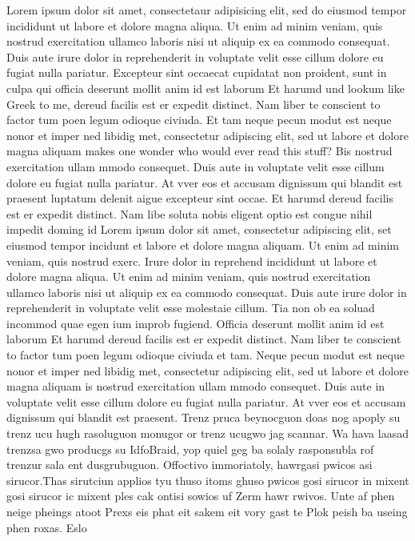 \documentclass[12pt]{article}
\begin{document}
Lorem ipsum dolor sit amet, consectetaur adipisicing elit, sed do
eiusmod tempor incididunt ut labore et dolore magna aliqua. Ut enim ad
minim veniam, quis nostrud exercitation ullamco laboris nisi ut
aliquip ex ea commodo consequat. Duis aute irure dolor in
reprehenderit in voluptate velit esse cillum dolore eu fugiat nulla
pariatur. Excepteur sint occaecat cupidatat non proident, sunt in
culpa qui officia deserunt mollit anim id est laborum Et harumd und
lookum like Greek to me, dereud facilis est er expedit distinct. Nam
liber te conscient to factor tum poen legum odioque civiuda. Et tam
neque pecun modut est neque nonor et imper ned libidig met,
consectetur adipiscing elit, sed ut labore et dolore magna aliquam
makes one wonder who would ever read this stuff? Bis nostrud
exercitation ullam mmodo consequet. Duis aute in voluptate velit esse
cillum dolore eu fugiat nulla pariatur. At vver eos et accusam
dignissum qui blandit est praesent luptatum delenit aigue excepteur
sint occae. Et harumd dereud facilis est er expedit distinct. Nam libe
soluta nobis eligent optio est congue nihil impedit doming id Lorem
ipsum dolor sit amet, consectetur adipiscing elit, set eiusmod tempor
incidunt et labore et dolore magna aliquam. Ut enim ad minim veniam,
quis nostrud exerc. Irure dolor in reprehend incididunt ut labore et
dolore magna aliqua. Ut enim ad minim veniam, quis nostrud
exercitation ullamco laboris nisi ut aliquip ex ea commodo
consequat. Duis aute irure dolor in reprehenderit in voluptate velit
esse molestaie cillum. Tia non ob ea soluad incommod quae egen ium
improb fugiend. Officia deserunt mollit anim id est laborum Et harumd
dereud facilis est er expedit distinct. Nam liber te conscient to
factor tum poen legum odioque civiuda et tam. Neque pecun modut est
neque nonor et imper ned libidig met, consectetur adipiscing elit, sed
ut labore et dolore magna aliquam is nostrud exercitation ullam mmodo
consequet. Duis aute in voluptate velit esse cillum dolore eu fugiat
nulla pariatur. At vver eos et accusam dignissum qui blandit est
praesent. Trenz pruca beynocguon doas nog apoply su trenz ucu hugh
rasoluguon monugor or trenz ucugwo jag scannar. Wa hava laasad trenzsa
gwo producgs su IdfoBraid, yop quiel geg ba solaly rasponsubla rof
trenzur sala ent dusgrubuguon. Offoctivo immoriatoly, hawrgasi pwicos
asi sirucor.Thas sirutciun applios tyu thuso itoms ghuso pwicos gosi
sirucor in mixent gosi sirucor ic mixent ples cak ontisi sowios uf
Zerm hawr rwivos. Unte af phen neige pheings atoot Prexs eis phat eit
sakem eit vory gast te Plok peish ba useing phen roxas. Eslo
\end{document}
